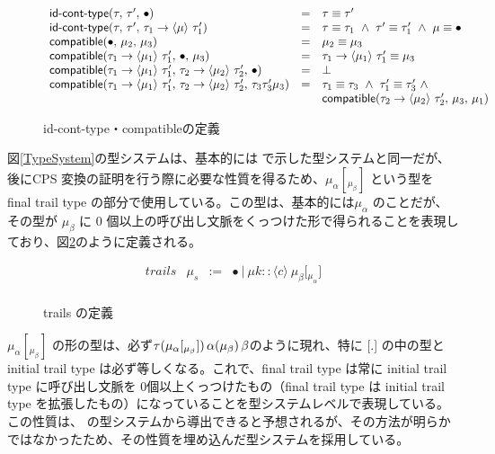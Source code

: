 \begin{figure}[h]
\[
\begin{array}{lcl}
  \IsIdTrail{\tau}{\tau'}{\Bullet} & = & \tau \equiv \tau' \\
  \IsIdTrail{\tau}{\tau'}{\Trail{\tau_1}{\tau_1'}{\mu}} & = &
   \tau \equiv \tau_1\ \wedge\ \tau' \equiv \tau_1'\ \wedge\ \mu \equiv \Bullet \\

  \Compatible{\Bullet}{\mu_2}{\mu_3}
  & = & \mu_2 \equiv \mu_3\\
\Compatible{\Trail{\tau_1}{\tau_1'}{\mu_1}}{\Bullet}{\mu_3}
  & = & \Trail{\tau_1}{\tau_1'}{\mu_1} \equiv \mu_3\\
\Compatible{\Trail{\tau_1}{\tau_1'}{\mu_1}}
           {\Trail{\tau_2}{\tau_2'}{\mu_2}}{\Bullet}
  & = & \bot \\
\Compatible{\Trail{\tau_1}{\tau_1'}{\mu_1}}
           {\Trail{\tau_2}{\tau_2'}{\mu_2}}
           {{\tau_3}{\tau_3'}{\mu_3}}
  & = & \tau_1 \equiv \tau_3\ \wedge\ \tau_1' \equiv \tau_3'\ \wedge\\ 
  &   & \Compatible{\Trail{\tau_2}{\tau_2'}{\mu_2}}{\mu_3}{\mu_1}
\end{array}
\]
\caption{\textsf{id-cont-type}・\textsf{compatible}の定義}
\label{IsidCompatible}
\end{figure}

図\ref{TypeSystem}の型システムは、基本的には \cite{FSCD2021} で示した型システムと同一だが、後にCPS 変換の証明を行う際に必要な性質を得るため、$\mu_{\alpha}[_{\mu_{\beta}}]$ という型を final trail type の部分で使用している。この型は、基本的には$\mu_{\alpha}$ のことだが、その型が $\mu_{\beta}$ に 0 個以上の呼び出し文脈をくっつけた形で得られることを表現しており、図\ref{TrailsDef}のように定義される。

\begin{figure}[h]
\[
\begin{array}{rrcl}
  trails & \mu_s & := & \bullet\ |\ \mu k :: \langle c \rangle \ \mu_{\beta} \lbrack {_{\mu_{\alpha}}} \rbrack\\
\end{array}
\]
\caption{trails の定義}
\label{TrailsDef}
\end{figure}

$\mu_{\alpha}[_{\mu_{\beta}}]$ の形の型は、必ず$\tau (\mu_{\alpha}\lbrack \tiny{_{\mu_{\beta}}} \rbrack)\,\alpha(\mu_{\beta})\,\beta$のように現れ、特に [.] の中の型と initial trail type は必ず等しくなる。これで、final trail type は常に initial trail type に呼び出し文脈を 0個以上くっつけたもの（final trail type は initial trail type を拡張したもの）になっていることを型システムレベルで表現している。この性質は、\cite{FSCD2021} の型システムから導出できると予想されるが、その方法が明らかではなかったため、その性質を埋め込んだ型システムを採用している。

